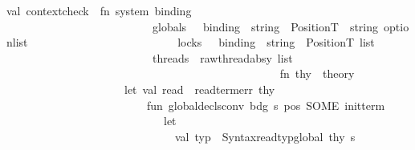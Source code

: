 \begin{isabellebody}
\isanewline
\isanewline
\isanewline
\isanewline
val\ context{\isacharunderscore}{\kern0pt}check\ {\isacharequal}{\kern0pt}\ fn\ {\isacharparenleft}{\kern0pt}{\isacharparenleft}{\kern0pt}{\isacharparenleft}{\kern0pt}system{\isacharcolon}{\kern0pt}\ binding\ {\isacharcomma}{\kern0pt}\ \isanewline
\ \ \ \ \ \ \ \ \ \ \ \ \ \ \ \ \ \ \ \ \ \ \ \ \ \ globals\ {\isacharcolon}{\kern0pt}\ \ {\isacharparenleft}{\kern0pt}{\isacharparenleft}{\kern0pt}binding\ {\isacharasterisk}{\kern0pt}\ {\isacharparenleft}{\kern0pt}string\ {\isacharasterisk}{\kern0pt}\ Position{\isachardot}{\kern0pt}T{\isacharparenright}{\kern0pt}{\isacharparenright}{\kern0pt}\ {\isacharasterisk}{\kern0pt}\ string\ option{\isacharparenright}{\kern0pt}list{\isacharparenright}{\kern0pt}{\isacharcomma}{\kern0pt}\isanewline
\ \ \ \ \ \ \ \ \ \ \ \ \ \ \ \ \ \ \ \ \ \ \ \ \ \ locks\ {\isacharcolon}{\kern0pt}\ \ {\isacharparenleft}{\kern0pt}binding\ {\isacharasterisk}{\kern0pt}\ {\isacharparenleft}{\kern0pt}string\ {\isacharasterisk}{\kern0pt}\ Position{\isachardot}{\kern0pt}T{\isacharparenright}{\kern0pt}{\isacharparenright}{\kern0pt}\ list{\isacharparenright}{\kern0pt}{\isacharcomma}{\kern0pt}\isanewline
\ \ \ \ \ \ \ \ \ \ \ \ \ \ \ \ \ \ \ \ \ \ \ \ \ \ threads\ {\isacharcolon}{\kern0pt}\ raw{\isacharunderscore}{\kern0pt}thread{\isacharunderscore}{\kern0pt}absy\ list{\isacharparenright}{\kern0pt}\isanewline
\ \ \ \ \ \ \ \ \ \ \ \ \ \ \ \ \ \ \ \ \ \ \ \ \ \ \ {\isacharequal}{\kern0pt}{\isachargreater}{\kern0pt}\isanewline
\ \ \ \ \ \ \ \ \ \ \ \ \ \ \ \ \ \ \ \ \ fn\ thy\ {\isacharcolon}{\kern0pt}\ theory\ {\isacharequal}{\kern0pt}{\isachargreater}{\kern0pt}\ \isanewline
\ \ \ \ \ \ \ \ \ \ \ \ \ \ \ \ \ \ \ \ \ let\ val\ read\ {\isacharequal}{\kern0pt}\ read{\isacharunderscore}{\kern0pt}term{\isacharunderscore}{\kern0pt}err\ thy\isanewline
\ \ \ \ \ \ \ \ \ \ \ \ \ \ \ \ \ \ \ \ \ \ \ \ \ fun\ global{\isacharunderscore}{\kern0pt}decls{\isacharunderscore}{\kern0pt}conv\ {\isacharparenleft}{\kern0pt}{\isacharparenleft}{\kern0pt}bdg{\isacharcomma}{\kern0pt}\ {\isacharparenleft}{\kern0pt}s{\isacharcomma}{\kern0pt}\ pos{\isacharparenright}{\kern0pt}{\isacharparenright}{\kern0pt}{\isacharcomma}{\kern0pt}\ SOME\ init{\isacharunderscore}{\kern0pt}term{\isacharparenright}{\kern0pt}\ {\isacharequal}{\kern0pt}\isanewline
\ \ \ \ \ \ \ \ \ \ \ \ \ \ \ \ \ \ \ \ \ \ \ \ \ \ \ \ let\ \isanewline
\ \ \ \ \ \ \ \ \ \ \ \ \ \ \ \ \ \ \ \ \ \ \ \ \ \ \ \ \ \ val\ typ\ {\isacharequal}{\kern0pt}\ Syntax{\isachardot}{\kern0pt}read{\isacharunderscore}{\kern0pt}typ{\isacharunderscore}{\kern0pt}global\ thy\ s\isanewline

\end{isabellebody}
